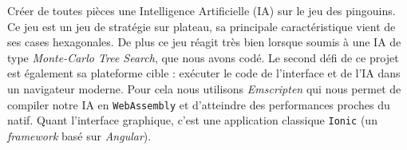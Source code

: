 Créer de toutes pièces une Intelligence Artificielle (IA) sur le jeu des
pingouins. Ce jeu est un jeu de stratégie sur plateau, sa principale
caractéristique vient de ses cases hexagonales. De plus ce jeu réagit
très bien lorsque soumis à une IA de type \emph{Monte-Carlo Tree
Search}, que nous avons codé. Le second défi de ce projet est également
sa plateforme cible : exécuter le code de l'interface et de l'IA dans un
navigateur moderne. Pour cela nous utilisons \emph{Emscripten} qui nous
permet de compiler notre IA en \texttt{WebAssembly} et d'atteindre des
performances proches du natif. Quant l'interface graphique, c'est une
application classique \texttt{Ionic} (un \emph{framework} basé sur
\emph{Angular}).
